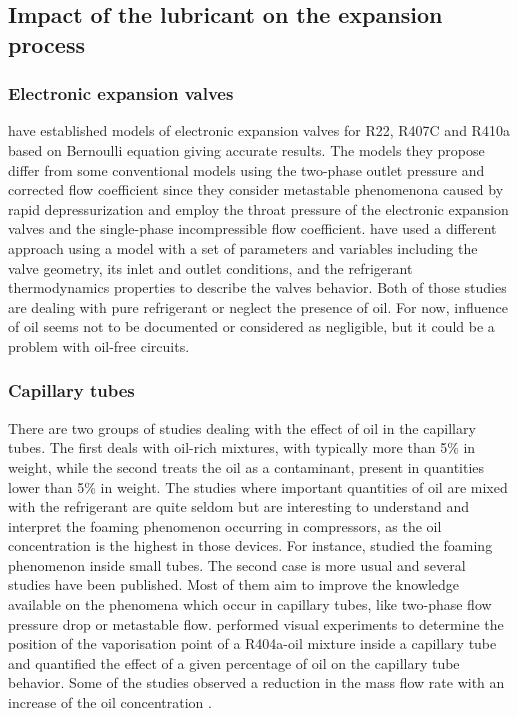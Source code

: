 \subsection{Impact of the lubricant on the expansion process}
\label{sec:oil-dv}

\subsubsection{Electronic expansion valves}

\citet{Liang-Zhijiu-2009a} have established models of electronic
expansion valves for R22, R407C and R410a based on Bernoulli equation
giving accurate results. The models they propose differ from some
conventional models using the two-phase outlet pressure and corrected
flow coefficient since they consider metastable phenomenona caused by
rapid depressurization and employ the throat pressure of the
electronic expansion valves and the single-phase incompressible flow
coefficient. \citet{Park-Kim-2007a} have used a different approach
using a model with a set of parameters and variables including the
valve geometry, its inlet and outlet conditions, and the refrigerant
thermodynamics properties to describe the valves behavior. Both of
those studies are dealing with pure refrigerant or neglect the
presence of oil. For now, influence of oil seems not to be documented
or considered as negligible, but it could be a problem with oil-free
circuits.

\subsubsection{Capillary tubes}

There are two groups of studies dealing with the effect of oil in the
capillary tubes. The first deals with oil-rich mixtures, with
typically more than 5\% in weight, while the second treats the oil as
a contaminant, present in quantities lower than 5\% in weight. The
studies where important quantities of oil are mixed with the
refrigerant are quite seldom but are interesting to understand and
interpret the foaming phenomenon occurring in compressors, as the oil
concentration is the highest in those devices. For instance,
\citet{Poiate-Gasche-2006a} studied the foaming phenomenon inside
small tubes. The second case is more usual and several studies have
been published. Most of them aim to improve the knowledge available on
the phenomena which occur in capillary tubes, like two-phase flow
pressure drop or metastable flow. \citet{Motta-Braga-2002a} performed visual
experiments to determine the position of the vaporisation point of a
R404a-oil mixture inside a capillary tube and quantified the effect of
a given percentage of oil on the capillary tube behavior. Some of the
studies observed a reduction in the mass flow rate with an increase of
the oil concentration \citep{Motta-Parise-2001a,Fukuta-Ogi-2003a}.

